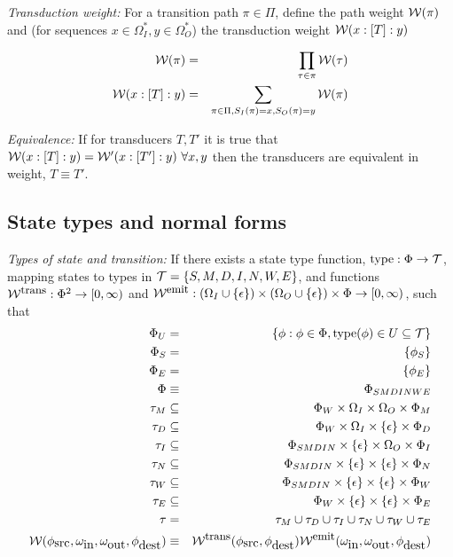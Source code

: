 \documentclass{article}
\newcommand{\seclabel}[1]{\label{sec.#1}}
\newcommand\gappedalphabet[1]{(\Omega_{#1} \cup \{\epsilon\})}
\newcommand\gappedpair[2]{\gappedalphabet{#1} \times \gappedalphabet{#2}}
\newcommand\wtrans[4]{#1(#2 : [#3] : #4)}
\newcommand\transequiv{\equiv}
\newcommand\States{\Phi}
\newcommand\Transitions{\tau}
\newcommand\startstate{\phi_S}
\newcommand\laststate{\phi_E}
\newcommand\weight{{\cal W}}
\newcommand\weightfunof[1]{\weight_{#1}}
\newcommand\transweightfun[1]{\weightfunof{#1}^{\mbox{\small trans}}}
\newcommand\emitweightfun[1]{\weightfunof{#1}^{\mbox{\small emit}}}
\newcommand\statesoftype[1]{\States_{#1}}
\newcommand\statetype{\mbox{type}}
\begin{document}
{\em Transduction weight:}
For a transition path $\pi \in \Pi$,
define the path weight $\weight(\pi)$ and
(for sequences $x \in \Omega_I^\ast, y \in \Omega_O^\ast$)
the transduction weight $\wtrans{\weight}{x}{T}{y}$

\begin{eqnarray*}
\weight(\pi) & = & \prod_{\Transitions \in \pi} \weight(\Transitions) \\
\wtrans{\weight}{x}{T}{y} & = & \sum_{\pi \in \Pi, S_I(\pi)=x, S_O(\pi)=y} \weight(\pi)
\end{eqnarray*}

{\em Equivalence:}
If for transducers $T,T'$ it is true that $\wtrans{\weight}{x}{T}{y}=\wtrans{\weight'}{x}{T'}{y}\ \forall x,y$ then the transducers are equivalent in weight, $T \transequiv T'$.

\subsection{State types and normal forms}
\seclabel{StateTypes}
{\em Types of state and transition:}
If there exists a state type function, $\statetype:\States \to {\cal T}$, mapping states to types in ${\cal T} = \{S,M,D,I,N,W,E\}$,
and functions $\transweightfun{}: \States^2 \to [0,\infty)$ and $\emitweightfun{}: \gappedpair{I}{O} \times \States \to [0,\infty)$,
such that
\begin{eqnarray*}
\States_U & = & \{ \phi: \phi\in\States, \statetype(\phi) \in U \subseteq {\cal T} \} \\
\statesoftype{S} & = & \{ \startstate \} \\
\statesoftype{E} & = & \{ \laststate \} \\
\States & \equiv & \statesoftype{SMDINWE} \\   
\Transitions_M & \subseteq & \statesoftype{W} \times \Omega_I \times \Omega_O \times \statesoftype{M} \\
\Transitions_D & \subseteq & \statesoftype{W} \times \Omega_I \times \{\epsilon\} \times \statesoftype{D} \\
\Transitions_I & \subseteq & \statesoftype{SMDIN} \times \{\epsilon\} \times \Omega_O \times \statesoftype{I} \\
\Transitions_N & \subseteq & \statesoftype{SMDIN} \times \{\epsilon\} \times \{\epsilon\} \times \statesoftype{N} \\
\Transitions_W & \subseteq & \statesoftype{SMDIN} \times \{\epsilon\} \times \{\epsilon\} \times \statesoftype{W} \\
\Transitions_E & \subseteq & \statesoftype{W} \times \{\epsilon\} \times \{\epsilon\} \times \statesoftype{E} \\
\Transitions & = & \Transitions_M \cup \Transitions_D \cup \Transitions_I \cup \Transitions_N \cup \Transitions_W \cup \Transitions_E \\
\weight(\phi_{\mbox{src}},\omega_{\mbox{in}},\omega_{\mbox{out}},\phi_{\mbox{dest}}) & \equiv & \transweightfun{}(\phi_{\mbox{src}},\phi_{\mbox{dest}}) \emitweightfun{}(\omega_{\mbox{in}},\omega_{\mbox{out}},\phi_{\mbox{dest}})
\end{eqnarray*}
\end{document}
